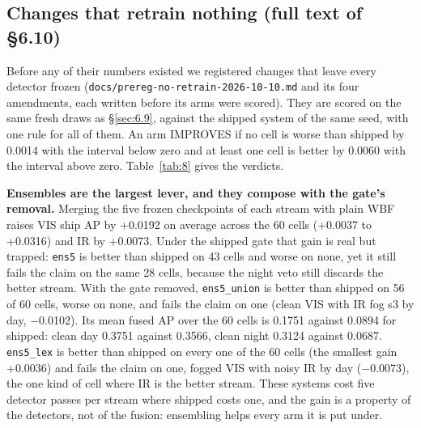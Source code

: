 \documentclass[10pt]{article}
\begin{document}
\subsection{Changes that retrain nothing (full text of \S6.10)}\label{app:J.4}
Before any of their numbers existed we registered changes that leave every detector frozen (\texttt{docs/\allowbreak{}prereg-no-retrain-2026-10-10.md} and its four amendments, each written before its arms were scored). They are scored on the same fresh draws as \S\ref{sec:6.9}, against the shipped system of the same seed, with one rule for all of them. An arm IMPROVES if no cell is worse than shipped by 0.0014 with the interval below zero and at least one cell is better by 0.0060 with the interval above zero. Table~\ref{tab:8} gives the verdicts.

\textbf{Ensembles are the largest lever, and they compose with the gate's removal.} Merging the five frozen checkpoints of each stream with plain WBF raises VIS ship AP by +0.0192 on average across the 60 cells (+0.0037 to +0.0316) and IR by +0.0073. Under the shipped gate that gain is real but trapped: \texttt{ens5} is better than shipped on 43 cells and worse on none, yet it still fails the claim on the same 28 cells, because the night veto still discards the better stream. With the gate removed, \texttt{ens5\_\allowbreak{}union} is better than shipped on 56 of 60 cells, worse on none, and fails the claim on one (clean VIS with IR fog s3 by day, $-$0.0102). Its mean fused AP over the 60 cells is 0.1751 against 0.0894 for shipped: clean day 0.3751 against 0.3566, clean night 0.3124 against 0.0687. \texttt{ens5\_\allowbreak{}lex} is better than shipped on every one of the 60 cells (the smallest gain +0.0036) and fails the claim on one, fogged VIS with noisy IR by day ($-$0.0073), the one kind of cell where IR is the better stream. These systems cost five detector passes per stream where shipped costs one, and the gain is a property of the detectors, not of the fusion: ensembling helps every arm it is put under.
\end{document}
